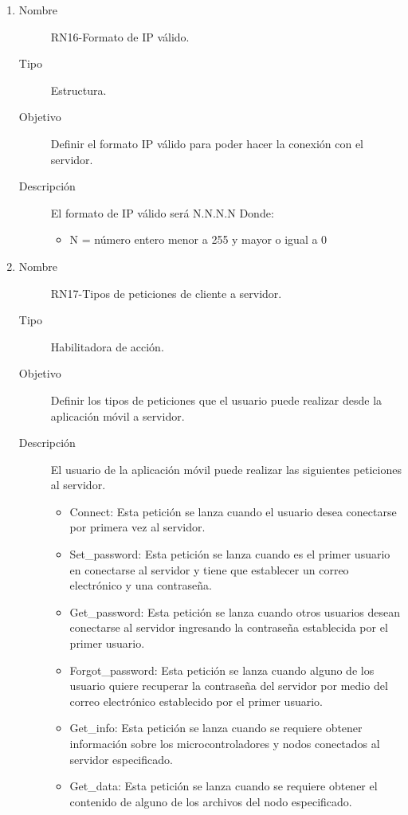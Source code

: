 \begin{enumerate}[label=RN\arabic*.]
\item \label{RN16}
		\begin{description}
			\item[Nombre] RN16-Formato de IP válido.
			\item[Tipo] Estructura.
			\item[Objetivo] Definir el formato IP válido para poder hacer la conexión con el servidor.
			\item[Descripción] El formato de IP válido será N.N.N.N
			Donde:
			\begin{itemize}
		 		\item N = número entero menor a 255 y mayor o igual a 0
		    \end{itemize}
		\end{description}

\item \label{RN17}
		\begin{description}
			\item[Nombre] RN17-Tipos de peticiones de cliente a servidor.
			\item[Tipo] Habilitadora de acción.
			\item[Objetivo] Definir los tipos de peticiones que el usuario puede realizar desde la aplicación móvil a servidor.
			\item[Descripción] El usuario de la aplicación móvil puede realizar las siguientes peticiones al servidor.
			\begin{itemize}
		 		\item Connect: Esta petición se lanza cuando el usuario desea conectarse por primera vez al servidor.
		 		\item Set\_password: Esta petición se lanza cuando es el primer usuario en conectarse al servidor y tiene que establecer un correo electrónico y una contraseña.
		 		\item Get\_password: Esta petición se lanza cuando otros usuarios desean conectarse al servidor ingresando la contraseña establecida por el primer usuario.
		 		\item Forgot\_password: Esta petición se lanza cuando alguno de los usuario quiere recuperar la contraseña del servidor por medio del correo electrónico establecido por el primer usuario.
		 		\item Get\_info: Esta petición se lanza cuando se requiere obtener información sobre los microcontroladores y nodos conectados al servidor especificado.
		 		\item Get\_data: Esta petición se lanza cuando se requiere obtener el contenido de alguno de los archivos del nodo especificado.
		    \end{itemize}
		\end{description}



\end{enumerate}
